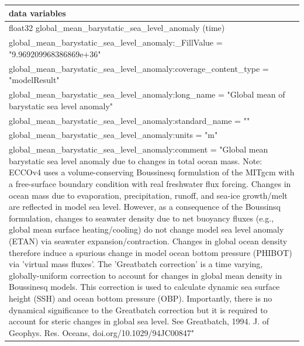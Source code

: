 \begin{longtable}{|p{\textwidth}|}
data variables\\
\hline
\hspace{0.5cm}float32 global\_mean\_barystatic\_sea\_level\_anomaly (time)\\
\hspace{0.5cm}\hspace{0.5cm}global\_mean\_barystatic\_sea\_level\_anomaly:\_FillValue = "9.969209968386869e+36"\\
\hspace{0.5cm}\hspace{0.5cm}global\_mean\_barystatic\_sea\_level\_anomaly:coverage\_content\_type = "modelResult"\\
\hspace{0.5cm}\hspace{0.5cm}global\_mean\_barystatic\_sea\_level\_anomaly:long\_name = "Global mean of barystatic sea level anomaly"\\
\hspace{0.5cm}\hspace{0.5cm}global\_mean\_barystatic\_sea\_level\_anomaly:standard\_name = ""\\
\hspace{0.5cm}\hspace{0.5cm}global\_mean\_barystatic\_sea\_level\_anomaly:units = "m"\\
\hspace{0.5cm}\hspace{0.5cm}global\_mean\_barystatic\_sea\_level\_anomaly:comment = "Global mean barystatic sea level anomaly due to changes in total ocean mass. Note: ECCOv4 uses a volume-conserving Boussinesq formulation of the MITgcm with a free-surface boundary condition with real freshwater flux forcing. Changes in ocean mass due to evaporation, precipitation, runoff, and sea-ice growth/melt are reflected in model sea level. However, as a consequence of the Boussinsq formulation, changes to seawater density due to net buoyancy fluxes (e.g., global mean surface heating/cooling) do not change model sea level anomaly (ETAN) via seawater expansion/contraction. Changes in global ocean density therefore induce a spurious change in model ocean bottom pressure (PHIBOT) via 'virtual mass fluxes'. The 'Greatbatch correction' is a time varying, globally-uniform correction to account for changes in global mean density in Boussinesq models. This correction is used to calculate dynamic sea surface height (SSH) and ocean bottom pressure (OBP). Importantly, there is no dynamical significance to the Greatbatch correction but it is required to account for steric changes in global sea level. See Greatbatch, 1994. J. of Geophys. Res. Oceans, doi.org/10.1029/94JC00847"\\

\end{longtable}
